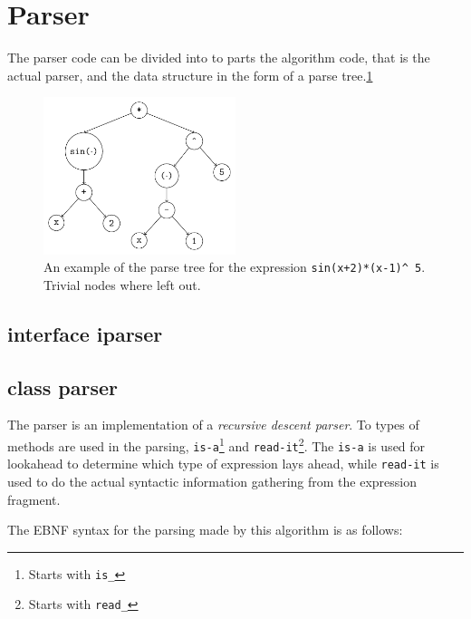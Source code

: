 \documentclass[a4paper,11pt]{kth-mag}
\begin{document}
\section{Parser}
The parser code can be divided into to parts the algorithm code, that is the 
actual parser, and the data structure in the form of a parse
tree.\ref{fig:parsetree}

\begin{figure}[ht]
\begin{center}
    \includegraphics[width=0.5\textwidth]{parse-tree.pdf}
    \caption{\small{
        An example of the parse tree for the
        expression \texttt{sin(x+2)*(x-1)}\texttt{\^~}\!\!\texttt{5}.
        Trivial nodes where left out.
    }}
   \label{fig:parsetree}
\end{center}
\end{figure}


\subsection{interface iparser}

\subsection{class parser}
The parser is an implementation of a \emph{recursive descent parser}. To
types of methods are used in the parsing, \texttt{is-a}\footnote{Starts with
\texttt{is\_}} and \texttt{read-it}\footnote{Starts with \texttt{read\_}}.
The \texttt{is-a} is used for lookahead to determine which type of expression
lays ahead, while \texttt{read-it} is used to do the actual syntactic information
gathering from the expression fragment.

The EBNF syntax for the parsing made by this algorithm is as follows:\\

\end{document}
